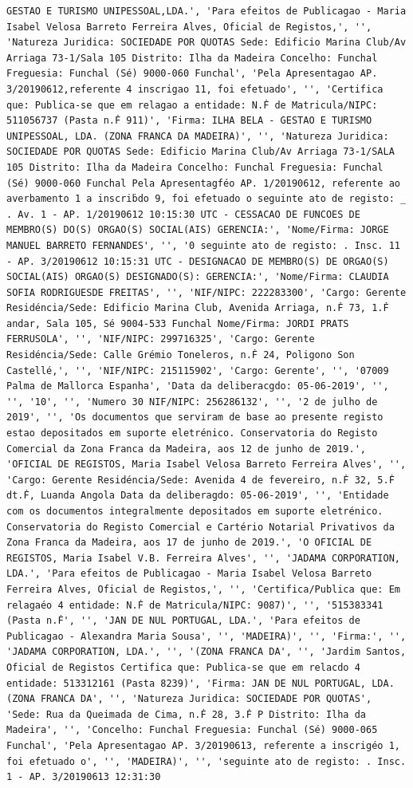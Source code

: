 \documentclass[
  12pt,
]{article}
\begin{document}
\begin{verbatim}
GESTAO E TURISMO UNIPESSOAL,LDA.', 'Para efeitos de Publicagao - Maria Isabel Velosa Barreto Ferreira Alves, Oficial de Registos,', '', 'Natureza Juridica: SOCIEDADE POR QUOTAS Sede: Edificio Marina Club/Av Arriaga 73-1/Sala 105 Distrito: Ilha da Madeira Concelho: Funchal Freguesia: Funchal (Sé) 9000-060 Funchal', 'Pela Apresentagao AP. 3/20190612,referente 4 inscrigao 11, foi efetuado', '', 'Certifica que: Publica-se que em relagao a entidade: N.Ḟ de Matricula/NIPC: 511056737 (Pasta n.Ḟ 911)', 'Firma: ILHA BELA - GESTAO E TURISMO UNIPESSOAL, LDA. (ZONA FRANCA DA MADEIRA)', '', 'Natureza Juridica: SOCIEDADE POR QUOTAS Sede: Edificio Marina Club/Av Arriaga 73-1/SALA 105 Distrito: Ilha da Madeira Concelho: Funchal Freguesia: Funchal (Sé) 9000-060 Funchal Pela Apresentagféo AP. 1/20190612, referente ao averbamento 1 a inscriḃdo 9, foi efetuado o seguinte ato de registo: _ . Av. 1 - AP. 1/20190612 10:15:30 UTC - CESSACAO DE FUNCOES DE MEMBRO(S) DO(S) ORGAO(S) SOCIAL(AIS) GERENCIA:', 'Nome/Firma: JORGE MANUEL BARRETO FERNANDES', '', '0 seguinte ato de registo: . Insc. 11 - AP. 3/20190612 10:15:31 UTC - DESIGNACAO DE MEMBRO(S) DE ORGAO(S) SOCIAL(AIS) ORGAO(S) DESIGNADO(S): GERENCIA:', 'Nome/Firma: CLAUDIA SOFIA RODRIGUESDE FREITAS', '', 'NIF/NIPC: 222283300', 'Cargo: Gerente Residéncia/Sede: Edificio Marina Club, Avenida Arriaga, n.Ḟ 73, 1.Ḟ andar, Sala 105, Sé 9004-533 Funchal Nome/Firma: JORDI PRATS FERRUSOLA', '', 'NIF/NIPC: 299716325', 'Cargo: Gerente Residéncia/Sede: Calle Grémio Toneleros, n.Ḟ 24, Poligono Son Castellé,', '', 'NIF/NIPC: 215115902', 'Cargo: Gerente', '', '07009 Palma de Mallorca Espanha', 'Data da deliberacgdo: 05-06-2019', '', '', '10', '', 'Numero 30 NIF/NIPC: 256286132', '', '2 de julho de 2019', '', 'Os documentos que serviram de base ao presente registo estao depositados em suporte eletrénico. Conservatoria do Registo Comercial da Zona Franca da Madeira, aos 12 de junho de 2019.', 'OFICIAL DE REGISTOS, Maria Isabel Velosa Barreto Ferreira Alves', '', 'Cargo: Gerente Residéncia/Sede: Avenida 4 de fevereiro, n.Ḟ 32, 5.Ḟ dt.Ḟ, Luanda Angola Data da deliberagdo: 05-06-2019', '', 'Entidade com os documentos integralmente depositados em suporte eletrénico. Conservatoria do Registo Comercial e Cartério Notarial Privativos da Zona Franca da Madeira, aos 17 de junho de 2019.', 'O OFICIAL DE REGISTOS, Maria Isabel V.B. Ferreira Alves', '', 'JADAMA CORPORATION, LDA.', 'Para efeitos de Publicagao - Maria Isabel Velosa Barreto Ferreira Alves, Oficial de Registos,', '', 'Certifica/Publica que: Em relagaéo 4 entidade: N.Ḟ de Matricula/NIPC: 9087)', '', '515383341 (Pasta n.Ḟ', '', 'JAN DE NUL PORTUGAL, LDA.', 'Para efeitos de Publicagao - Alexandra Maria Sousa', '', 'MADEIRA)', '', 'Firma:', '', 'JADAMA CORPORATION, LDA.', '', '(ZONA FRANCA DA', '', 'Jardim Santos, Oficial de Registos Certifica que: Publica-se que em relacdo 4 entidade: 513312161 (Pasta 8239)', 'Firma: JAN DE NUL PORTUGAL, LDA. (ZONA FRANCA DA', '', 'Natureza Juridica: SOCIEDADE POR QUOTAS', 'Sede: Rua da Queimada de Cima, n.Ḟ 28, 3.Ḟ P Distrito: Ilha da Madeira', '', 'Concelho: Funchal Freguesia: Funchal (Sé) 9000-065 Funchal', 'Pela Apresentagao AP. 3/20190613, referente a inscrigéo 1, foi efetuado o', '', 'MADEIRA)', '', 'seguinte ato de registo: . Insc. 1 - AP. 3/20190613 12:31:30 
\end{verbatim}
\end{document}
